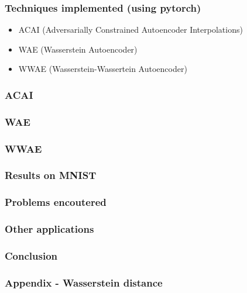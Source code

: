 \documentclass{beamer}
\begin{document}
\begin{frame}
\frametitle{Techniques implemented (using pytorch)}
  \begin{itemize}
    \item ACAI (Adversarially Constrained Autoencoder Interpolations)
    \medskip
    \item WAE (Wasserstein Autoencoder)
    \medskip
    \item WWAE (Wasserstein-Wassertein Autoencoder)
  \end{itemize}
\end{frame}
\begin{frame}
\frametitle{ACAI}

\end{frame}
\begin{frame}
\frametitle{WAE}

\end{frame}
\begin{frame}
\frametitle{WWAE}

\end{frame}
\begin{frame}
\frametitle{Results on MNIST}

\end{frame}
\begin{frame}
\frametitle{Problems encoutered}

\end{frame}
\begin{frame}
\frametitle{Other applications}

\end{frame}
\begin{frame}
\frametitle{Conclusion}

\end{frame}
\begin{frame}
\frametitle{Appendix - Wasserstein distance}

\end{frame}
\end{document}
